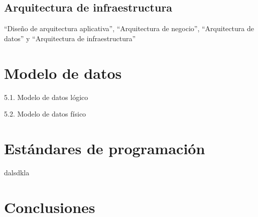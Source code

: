 \documentclass[a4paper,openright,12pt]{book}
\begin{document}
\section{Arquitectura de infraestructura}

 ``Diseño de arquitectura aplicativa'', ``Arquitectura de negocio'', ``Arquitectura de datos'' y ``Arquitectura de infraestructura''

\chapter*{Modelo de datos} \label{cap.modelo}%

5.1. Modelo de datos lógico

5.2. Modelo de datos físico

\chapter*{Estándares de programación} \label{cap.estandares}%

dalsdkla

\chapter*{Conclusiones} \label{cap.conclusiones}%
\end{document}
